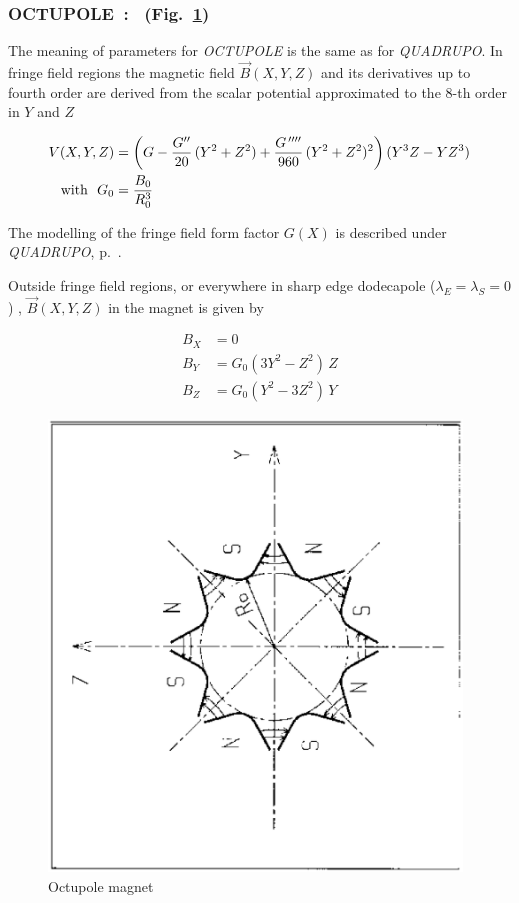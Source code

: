 \newpage

\subsubsection*{OCTUPOLE~: \OCTUPOLETitl\  (Fig.~\protect\ref{fig24}) } \label{OCTUPOLE}
\medskip 

 The meaning of parameters for \textsl{OCTUPOLE}  is the same as for 
\textsl{QUADRUPO}.  In fringe field regions the magnetic field $ \vec  B(X,Y,Z)$ and 
its derivatives up to fourth order are derived from the scalar potential 
approximated to the 8-th order in $ Y $ and $ Z $

\begin{align*}
	V(X,Y,Z) &   =   \left(G-\dfrac{G^{\prime\prime} }{ 20} \, (Y^2+Z^2)+
	              \dfrac{G^{\,\prime\prime\prime\prime} }{ 960}\, (Y^2+Z^2)^2 \right) (Y^3Z-YZ^3)   \\
	\text{with } ~ G_0 &   =  \dfrac{ B_0 }{ R^3_0} 
\end{align*}

\noindent The  modelling of the fringe field form factor  $G(X)$
 is described under \textsl{QUADRUPO}, p.~\pageref{QUADRUPO}. 

\medskip

\noindent Outside fringe field regions, or everywhere in sharp edge dodecapole
($ \lambda_ E=\lambda_ S=0$) , $ \vec  B(X,Y,Z) $ in the magnet is given by 

\begin{align*}
	B_X &   =   0 \\
	B_Y &   =   G_0(3Y^2-Z^2)\, Z  \\
	B_Z &   = G_0(Y^2-3Z^2) \, Y    
\end{align*}
\vfill

\begin{figure}[H]
\centerline{\includegraphics[height=12cm,angle=-90]{Fig24.ps}}
\caption{\label{fig24}Octupole magnet}
\end{figure}
\vfill

